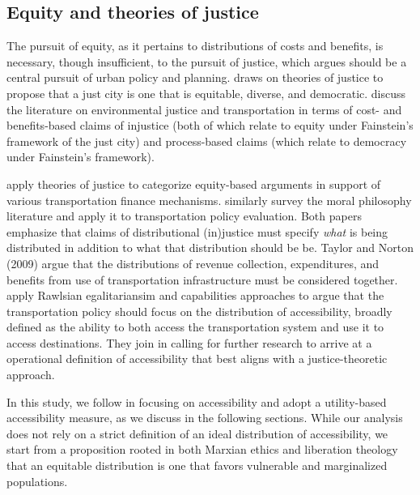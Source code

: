 \documentclass[3p, authoryear, review]{elsarticle} %
\begin{document}
\hypertarget{equity-and-theories-of-justice}{%
\subsection{Equity and theories of justice}\label{equity-and-theories-of-justice}}

The pursuit of equity, as it pertains to distributions of costs and benefits, is
necessary, though insufficient, to the pursuit of justice, which
\citet{fainstein_just_2010} argues should be a central pursuit of urban policy and
planning. \citet{fainstein_just_2010} draws on theories of justice to propose that a
just city is one that is equitable, diverse, and democratic.
\citet{schweitzer_environmental_2004} discuss the literature on environmental justice
and transportation in terms of cost- and benefits-based claims of injustice
(both of which relate to equity under Fainstein's framework of the
just city) and process-based claims (which relate to democracy under
Fainstein's framework).

\citet{taylor_paying_2009} apply theories of justice to categorize equity-based
arguments in support of various transportation finance mechanisms.
\citet{pereira_distributive_2017} similarly survey the moral philosophy literature
and apply it to transportation policy evaluation. Both papers emphasize that
claims of distributional (in)justice must specify \emph{what} is being distributed
in addition to what that distribution should be be. Taylor and Norton (2009)
argue that the distributions of revenue collection, expenditures, and benefits
from use of transportation infrastructure must be considered together.
\citet{pereira_distributive_2017} apply Rawlsian egalitariansim \citep{rawls2001justice}
and capabilities approaches \citep{sen2014development, nussbaum2001women} to argue
that the transportation policy should focus on the distribution of
accessibility, broadly defined as the ability to both access the
transportation system and use it to access destinations. They join
\citet{martens_justice-theoretic_2012} in calling for further research to arrive at a
operational definition of accessibility that best aligns with a
justice-theoretic approach.

In this study, we follow \citet{pereira_distributive_2017} in focusing on accessibility
and adopt a utility-based accessibility measure, as we discuss in the following
sections. While our analysis does not rely on a strict definition of an ideal
distribution of accessibility, we start from a proposition rooted in both
Marxian ethics \citep{heller_theory_1976} and liberation theology
\citep{john_paul_ii_centesimus_1991} that an equitable distribution is one that
favors vulnerable and marginalized populations.
\end{document}
